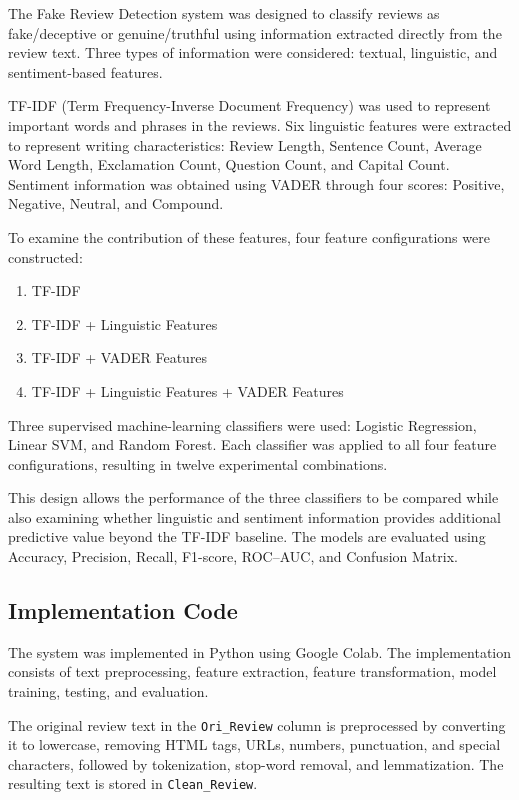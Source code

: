 \documentclass[12pt,a4paper]{report}
\begin{document}
The Fake Review Detection system was designed to classify reviews as
fake/deceptive or genuine/truthful using information extracted directly
from the review text. Three types of information were considered:
textual, linguistic, and sentiment-based features.

TF-IDF (Term Frequency-Inverse Document Frequency) was used to
represent important words and phrases in the reviews. Six linguistic
features were extracted to represent writing characteristics: Review
Length, Sentence Count, Average Word Length, Exclamation Count,
Question Count, and Capital Count. Sentiment information was obtained
using VADER through four scores: Positive, Negative, Neutral, and
Compound.

To examine the contribution of these features, four feature
configurations were constructed:

\begin{enumerate}
    \item TF-IDF
    \item TF-IDF + Linguistic Features
    \item TF-IDF + VADER Features
    \item TF-IDF + Linguistic Features + VADER Features
\end{enumerate}

Three supervised machine-learning classifiers were used: Logistic
Regression, Linear SVM, and Random Forest. Each classifier was applied
to all four feature configurations, resulting in twelve experimental
combinations.

This design allows the performance of the three classifiers to be
compared while also examining whether linguistic and sentiment
information provides additional predictive value beyond the TF-IDF
baseline. The models are evaluated using Accuracy, Precision, Recall,
F1-score, ROC--AUC, and Confusion Matrix.

\subsection{Implementation Code}

The system was implemented in Python using Google Colab. The
implementation consists of text preprocessing, feature extraction,
feature transformation, model training, testing, and evaluation.

The original review text in the \texttt{Ori\_Review} column is
preprocessed by converting it to lowercase, removing HTML tags, URLs,
numbers, punctuation, and special characters, followed by tokenization,
stop-word removal, and lemmatization. The resulting text is stored in
\texttt{Clean\_Review}.
\end{document}
